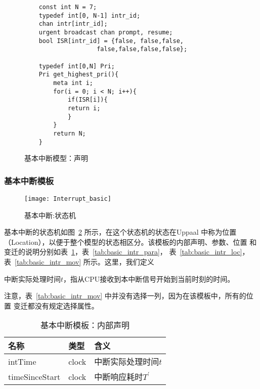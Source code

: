\begin{figure}[H]
	\centering
	\begin{lstlisting}
	const int N = 7;
	typedef int[0, N-1] intr_id; 
	chan intr[intr_id];
	urgent broadcast chan prompt, resume;
	bool ISR[intr_id] = {false, false,false,
					false,false,false,false};
	
	typedef int[0,N] Pri;
	Pri get_highest_pri(){
		meta int i;
		for(i = 0; i < N; i++){
			if(ISR[i]){
			return i;
			} 
		}
		return N;
	}
	\end{lstlisting}
	\caption{基本中断模型：声明}
	\label{fig:basic_decl}
\end{figure}

\subsubsection{基本中断模板}

\begin{figure}
	\centering
	\texttt{[image: Interrupt\_basic]}
	\caption{基本中断:状态机}
	\label{fig:interrupt_basic}
\end{figure}

基本中断的状态机如图~\ref{fig:interrupt_basic} 所示，在这个状态机的状态在Uppaal
中称为位置（Location），以便于整个模型的状态相区分。该模板的内部声明、参数、位置
和变迁的说明分别如表~\ref{tab:basic_intr_decl}，表~\ref{tab:basic_intr_para}，
表~\ref{tab:basic_intr_loc}，表~\ref{tab:basic_intr_mov} 所示。这里，我们定义

\begin{definition}
	中断实际处理时间$t$，指从CPU接收到本中断信号开始到当前时刻的时间。
\end{definition}

注意，表~\ref{tab:basic_intr_mov} 中并没有选择一列，因为在该模板中，所有的位置
变迁都没有规定选择属性。

\begin{table}[htb]
	\centering
	\caption{基本中断模板：内部声明}
	\label{tab:basic_intr_decl}
	\begin{tabularx}{\linewidth}{p{7em}p{5em}X}
		\toprule[1.5pt]
		{\heiti 名称} & {\heiti 类型} & {\heiti 含义}\\
		\midrule[1pt]
		intTime & clock & 中断实际处理时间$t$ \\
		\midrule[0.5pt]
		timeSinceStart & clock & 中断响应耗时$T^\prime$ \\
		\bottomrule[1.5pt]
	\end{tabularx}
\end{table}

